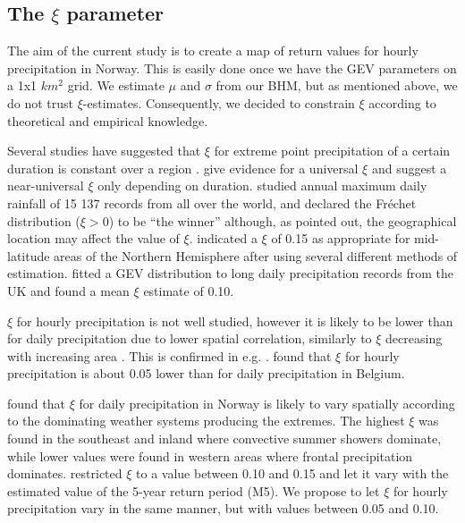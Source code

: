 \documentclass[12pt,a4paper,english]{article}
\begin{document}
\subsection{The $\xi$ parameter}

The aim of the current study is to create a map of return values for hourly precipitation in Norway. This is easily done once we have the GEV parameters on a 1x1 $km^2$ grid. We estimate $\mu$ and $\sigma$ from our BHM, but as mentioned above, we do not trust $\xi$-estimates. Consequently, we decided to constrain $\xi$ according to theoretical and empirical knowledge. 

Several studies have suggested that $\xi$ for extreme point precipitation of a certain duration is constant over a region \citep{Buishand1989, ColesandTawn1990, Buishand1991, ColesandTawn1996, Koutsoyiannis1999, Koutsoyiannis2004b}. \cite{WilsonandToumi2005} give evidence for a universal $\xi$ and \cite{Venezianoetal2009} suggest a near-universal $\xi$ only depending on duration. \cite{PapalexiouandKoutsoyiannis2013} studied annual maximum daily rainfall of 15 137 records from all over the world, and declared the Fr\'echet distribution ($\xi>0$) to be ``the winner'' although, as pointed out, the geographical location may affect the value of $\xi$. \cite{Koutsoyiannis2004b} indicated a $\xi$ of 0.15 as appropriate for mid-latitude areas of the Northern Hemisphere after using several different methods of estimation. \cite{WilsonandToumi2005} fitted a GEV distribution to long daily precipitation records from the UK and found a mean $\xi$ estimate of 0.10.

$\xi$ for hourly precipitation is not well studied, however it is likely to be lower than for daily precipitation due to lower spatial correlation, similarly to $\xi$ decreasing with increasing area \citep{Dyrrdaletal2013}. This is confirmed in e.g. \cite{Overeemetal2010}. \cite{VandeVyver2012} found that $\xi$ for hourly precipitation is about 0.05 lower than for daily precipitation in Belgium.

\cite{Dyrrdaletal2013} found that $\xi$ for daily precipitation in Norway is likely to vary spatially according to the dominating weather systems producing the extremes. The highest $\xi$ was found in the southeast and inland where convective summer showers dominate, while lower values were found in western areas where frontal precipitation dominates. \cite{Dyrrdaletal2013} restricted $\xi$ to a value between 0.10 and 0.15 and let it vary with the estimated value of the 5-year return period (M5). We propose to let $\xi$ for hourly precipitation vary in the same manner, but with values between 0.05 and 0.10.
\end{document}
